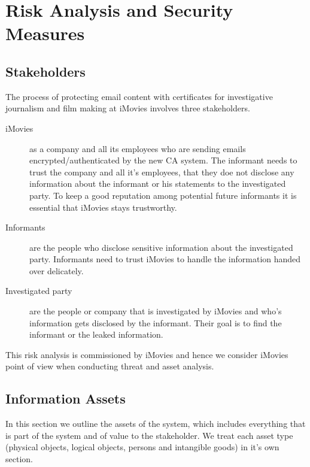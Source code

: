 \documentclass[a4paper, toc=index, 12pt, DIV14, twoside, BCOR2cm, headsepline, numbers=noenddot, bibliography=totoc]{scrbook}
\begin{document}
\chapter{Risk Analysis and Security Measures}
\section{Stakeholders}
The process of protecting email content with certificates for investigative journalism and film making at iMovies involves three stakeholders.
\begin{description}
\item[iMovies] as a company and all its employees who are sending emails encrypted/authenticated by the new CA system. The informant needs to trust the company and all it's employees, that they doe not disclose any information about the informant or his statements to the investigated party. To keep a good reputation among potential future informants it is essential that iMovies stays trustworthy.
\item[Informants] are the people who disclose sensitive information about the investigated party. Informants need to trust iMovies to handle the information handed over delicately.
\item[Investigated party] are the people or company that is investigated by iMovies and who's information gets disclosed by the informant. Their goal is to find the informant or the leaked information.
\end{description}
This risk analysis is commissioned by iMovies and hence we consider iMovies point of view when conducting threat and asset analysis.

\section{Information Assets}
In this section we outline the assets of the system, which includes everything that is part of the system and of value to the stakeholder. We treat each asset type (physical objects, logical objects, persons and intangible goods) in it's own section.
\end{document}
